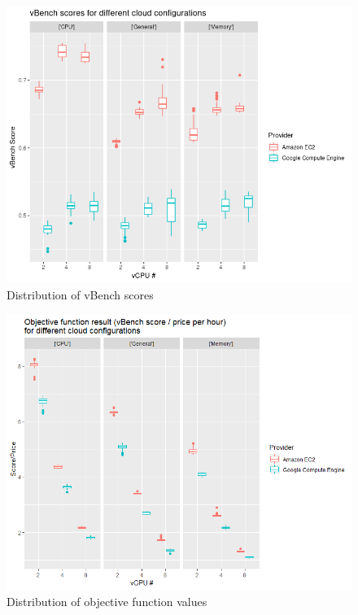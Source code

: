 \documentclass{article}
\begin{document}
\begin{figure}
  \centering
   \includegraphics[scale=0.8]{vbench_scores}
   \caption{Distribution of vBench scores}
  \label{fig:vBench-scores}
\end{figure}
\begin{figure}
  \centering
   \includegraphics[scale=0.8]{vbench_values}
   \caption{Distribution of objective function values}
  \label{fig:vBench-values}
\end{figure}
\end{document}
